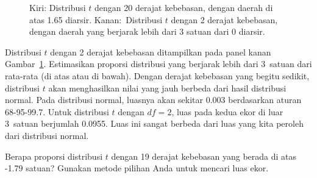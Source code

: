 \begin{figure}
  \centering
  \caption{Kiri: Distribusi $t$ dengan 20 derajat
      kebebasan, dengan daerah di atas 1.65 diarsir.
      Kanan:~Distribusi $t$ dengan 2 derajat kebebasan,
      dengan daerah yang berjarak lebih dari 3 satuan dari 0 diarsir.}
  \label{tDistDF20RightTail1Point65}
\end{figure}

\begin{examplewrap}
\begin{nexample}{Distribusi $t$ dengan 2 derajat kebebasan
    ditampilkan pada panel kanan
    Gambar~\ref{tDistDF20RightTail1Point65}.
    Estimasikan proporsi distribusi yang berjarak lebih
    dari 3~satuan dari rata-rata (di atas atau di bawah).}
  Dengan derajat kebebasan yang begitu sedikit, distribusi $t$
  akan menghasilkan nilai yang jauh berbeda dari hasil distribusi
  normal.
  Pada distribusi normal, luasnya akan sekitar
  0.003 berdasarkan aturan 68-95-99.7.
  Untuk distribusi $t$ dengan $df = 2$, luas pada kedua
  ekor di luar 3~satuan berjumlah 0.0955.
  Luas ini sangat berbeda dari luas yang
  kita peroleh dari distribusi normal.
\end{nexample}
\end{examplewrap}

\begin{exercisewrap}
\begin{nexercise}
Berapa proporsi distribusi $t$ dengan 19 derajat
kebebasan yang berada di atas -1.79 satuan?
Gunakan metode pilihan Anda untuk mencari luas ekor.\footnotemark{}
\end{nexercise}
\end{exercisewrap}




